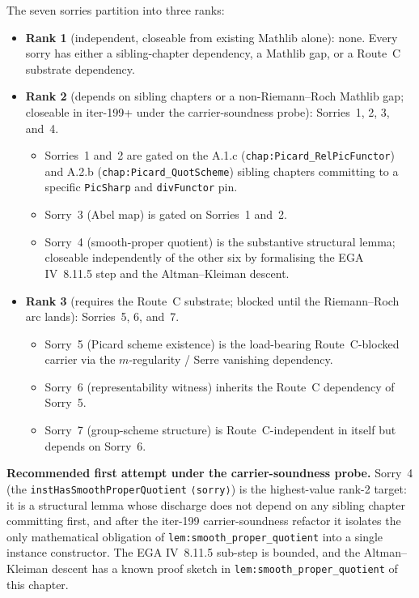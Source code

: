 The seven sorries partition into three ranks:
\begin{itemize}
  \item \textbf{Rank 1} (independent, closeable from existing
    Mathlib alone): none. Every sorry has either a sibling-chapter
    dependency, a Mathlib gap, or a Route~C substrate dependency.
  \item \textbf{Rank 2} (depends on sibling chapters or a
    non-Riemann--Roch Mathlib gap; closeable in iter-199+ under the
    carrier-soundness probe): Sorries~1, 2, 3, and~4.
    \begin{itemize}
      \item Sorries~1 and~2 are gated on the A.1.c
        (\texttt{chap:Picard_RelPicFunctor}) and A.2.b
        (\texttt{chap:Picard_QuotScheme}) sibling chapters
        committing to a specific \texttt{PicSharp} and
        \texttt{divFunctor} pin.
      \item Sorry~3 (Abel map) is gated on Sorries~1 and~2.
      \item Sorry~4 (smooth-proper quotient) is the substantive
        structural lemma; closeable independently of the other six
        by formalising the EGA IV~8.11.5 step and the Altman--Kleiman
        descent.
    \end{itemize}
  \item \textbf{Rank 3} (requires the Route~C substrate; blocked
    until the Riemann--Roch arc lands): Sorries~5, 6, and~7.
    \begin{itemize}
      \item Sorry~5 (Picard scheme existence) is the load-bearing
        Route~C-blocked carrier via the $m$-regularity / Serre
        vanishing dependency.
      \item Sorry~6 (representability witness) inherits the Route~C
        dependency of Sorry~5.
      \item Sorry~7 (group-scheme structure) is Route~C-independent
        in itself but depends on Sorry~6.
    \end{itemize}
\end{itemize}

\medskip

\textbf{Recommended first attempt under the carrier-soundness
probe.} Sorry~4 (the \texttt{instHasSmoothProperQuotient}
\texttt{⟨sorry⟩}) is the highest-value rank-2 target: it is a
structural lemma whose discharge does not depend on any sibling
chapter committing first, and after the iter-199 carrier-soundness
refactor it isolates the only mathematical obligation of
\texttt{lem:smooth_proper_quotient} into a single instance
constructor. The EGA IV~8.11.5 sub-step is bounded, and the
Altman--Kleiman descent has a known proof sketch in
\texttt{lem:smooth_proper_quotient} of this chapter.

